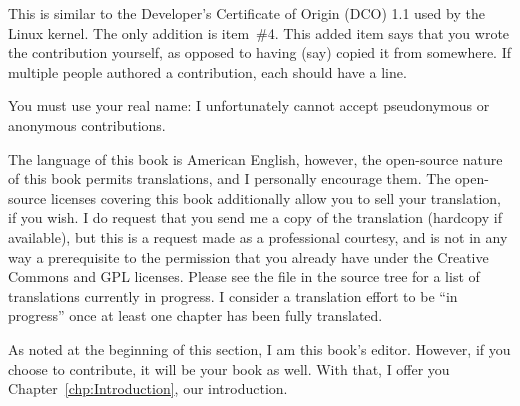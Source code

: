 This is similar to the Developer's Certificate of Origin (DCO) 1.1 used
by the Linux kernel.
The only addition is item~\#4.
This added item says that you wrote the contribution yourself, as opposed
to having (say) copied it from somewhere.
If multiple people authored a contribution, each should have a
 line.

You must use your real name:  I unfortunately cannot accept pseudonymous or
anonymous contributions.

The language of this book is American English, however, the open-source
nature of this book permits translations, and I personally encourage them.
The open-source licenses covering this book additionally allow you
to sell your translation, if you wish.
I do request that you send me a copy of the translation (hardcopy if
available), but this is a request made as a professional courtesy,
and is not in any way a prerequisite to the permission that you already
have under the Creative Commons and GPL licenses.
Please see the  file in the source tree for a list of
translations currently in progress.
I consider a translation effort to be ``in progress'' once at least one
chapter has been fully translated.

As noted at the beginning of this section, I am this book's editor.
However, if you choose to contribute, it will be your book as well.
With that, I offer you Chapter~\ref{chp:Introduction}, our introduction.
